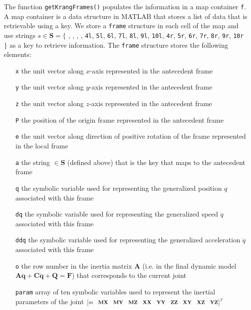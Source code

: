 \documentclass[a4paper,10pt]{article}
\newcommand\scalemath[2]{\scalebox{#1}{\mbox{\ensuremath{\displaystyle #2}}}}
\begin{document}
The function \texttt{getKrangFrames()} populates the information in a map container \texttt{f}. A map container is a data structure
in MATLAB that stores a list of data that is retrievable using a key. We store a \texttt{frame} structure in each
cell of the map and use strings $s \in \mathbf{S} = \lbrace$ \texttt{\textquotesingle }, \texttt{\textquotesingle }, 
\texttt{\textquotesingle }, \texttt{\textquotesingle }, \texttt{\textquotesingle 4l\textquotesingle }, 
\texttt{\textquotesingle 5l\textquotesingle }, \texttt{\textquotesingle 6l\textquotesingle }, \texttt{\textquotesingle 7l\textquotesingle },
\texttt{\textquotesingle 8l\textquotesingle }, \texttt{\textquotesingle 9l\textquotesingle }, \texttt{\textquotesingle 10l\textquotesingle },
\texttt{\textquotesingle 4r\textquotesingle }, \texttt{\textquotesingle 5r\textquotesingle }, \texttt{\textquotesingle 6r\textquotesingle }, 
\texttt{\textquotesingle 7r\textquotesingle }, \texttt{\textquotesingle 8r\textquotesingle }, \texttt{\textquotesingle 9r\textquotesingle }, 
\texttt{\textquotesingle 10r\textquotesingle } $\rbrace$ as a key to retrieve information. The \texttt{frame} structure
stores the following elements:
\begin{itemize}[label={}]
 \item[\texttt{x}] the unit vector along $x$-axis represented in the antecedent frame
 \item[\texttt{y}] the unit vector along $y$-axis represented in the antecedent frame
 \item[\texttt{z}] the unit vector along $z$-axis represented in the antecedent frame
 \item[\texttt{P}] the position of the origin frame represented in the antecedent frame
 \item[\texttt{e}] the unit vector along direction of positive rotation of the frame represented in the local frame
 \item[\texttt{a}] the string $\in \mathbf{S}$ (defined above) that is the key that maps to the antecedent frame
 \item[\texttt{q}] the symbolic variable used for representing the generalized position $q$ associated with this frame
 \item[\texttt{dq}] the symbolic variable used for representing the generalized speed $\dot{q}$ associated with this frame
 \item[\texttt{ddq}] the symbolic variable used for representing the generalized acceleration $\ddot{q}$ associated with this frame
 \item[\texttt{o}] the row number in the inertia matrix $\mathbf{A}$ (i.e. in the final dynamic model $\mathbf{A\ddot{q}+C\dot{q}+Q=F}$) 
 that corresponds to the current joint 
 \item[\texttt{param}] array of ten symbolic variables used to represent the inertial parameters of the joint
 $\scalemath{0.75}{\left[\begin{matrix} m & \mathbf{MX} & \mathbf{MY} & \mathbf{MZ} & \mathbf{XX} & \mathbf{YY} & \mathbf{ZZ} & \mathbf{XY} & \mathbf{XZ} & \mathbf{YZ} \end{matrix}\right]^T}$
\end{itemize}
\end{document}
